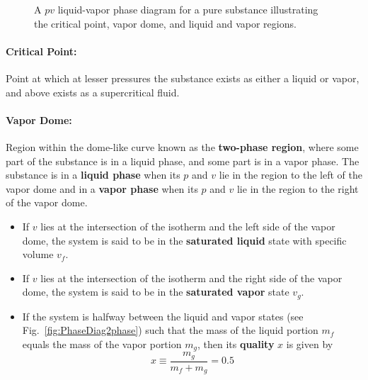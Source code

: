 \begin{figure}[h]
\begin{center}
\end{center}
\caption{A $pv$ liquid-vapor phase diagram for a pure substance illustrating the critical point, vapor dome, and liquid and vapor regions. }\label{fig:PhaseDiag}
\end{figure}
\paragraph{Critical Point:} Point at which at lesser pressures the substance exists as either a liquid or vapor, and above exists as a supercritical fluid.
\paragraph{Vapor Dome:} Region within the dome-like curve known as the \textbf{two-phase region}, where some part of the substance is in a liquid phase, and some part is in a vapor phase. The substance is in a \textbf{liquid phase} when its $p$ and $v$ lie in the region to the left of the vapor dome and in a \textbf{vapor phase} when its $p$ and $v$ lie in the region to the right of the vapor dome.
\begin{itemize}
    \item If $v$ lies at the intersection of the isotherm and the left side of the vapor dome, the system is said to be in the \textbf{saturated liquid} state with specific volume $v_f$.
    \item If $v$ lies at the intersection of the isotherm and the right side of the vapor dome, the system is said to be in the \textbf{saturated vapor} state $v_g$.
    \item If the system is halfway between the liquid and vapor states (see Fig.~\ref{fig:PhaseDiag2phase}) such that the mass of the liquid portion $m_f$ equals the mass of the vapor portion $m_g$, then its \textbf{quality} $x$ is given by
        \begin{equation}
            x \equiv \frac{m_g}{m_f + m_g} = 0.5
        \end{equation}
\end{itemize}

